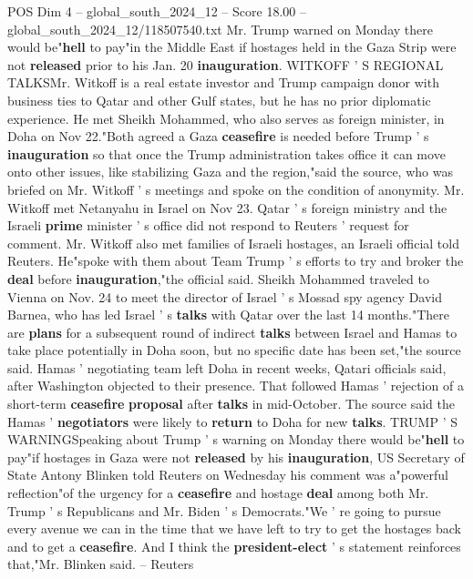 \begin{textsample}{POS Dim 4 – global\_south\_2024\_12 – Score 18.00 – global\_south\_2024\_12/118507540.txt}
Mr.
Trump warned on Monday there would be"\textbf{hell} to pay"in the Middle East if hostages held in the Gaza Strip were not \textbf{released} prior to his Jan. 20 \textbf{inauguration}.
WITKOFF ' S REGIONAL TALKSMr.
Witkoff is a real estate investor and Trump campaign donor with business ties to Qatar and other Gulf states, but he has no prior diplomatic experience.
He met Sheikh Mohammed, who also serves as foreign minister, in Doha on Nov 22."Both agreed a Gaza \textbf{ceasefire} is needed before Trump ' s \textbf{inauguration} so that once the Trump administration takes office it can move onto other issues, like stabilizing Gaza and the region,"said the source, who was briefed on Mr.
Witkoff ' s meetings and spoke on the condition of anonymity.
Mr.
Witkoff met Netanyahu in Israel on Nov 23.
Qatar ' s foreign ministry and the Israeli \textbf{prime} minister ' s office did not respond to Reuters ' request for comment.
Mr.
Witkoff also met families of Israeli hostages, an Israeli official told Reuters.
He"spoke with them about Team Trump ' s efforts to try and broker the \textbf{deal} before \textbf{inauguration},"the official said.
Sheikh Mohammed traveled to Vienna on Nov. 24 to meet the director of Israel ' s Mossad spy agency David Barnea, who has led Israel ' s \textbf{talks} with Qatar over the last 14 months."There are \textbf{plans} for a subsequent round of indirect \textbf{talks} between Israel and Hamas to take place potentially in Doha soon, but no specific date has been set,"the source said.
Hamas ' negotiating team left Doha in recent weeks, Qatari officials said, after Washington objected to their presence.
That followed Hamas ' rejection of a short-term \textbf{ceasefire} \textbf{proposal} after \textbf{talks} in mid-October.
The source said the Hamas ' \textbf{negotiators} were likely to \textbf{return} to Doha for new \textbf{talks}.
TRUMP ' S WARNINGSpeaking about Trump ' s warning on Monday there would be"\textbf{hell} to pay"if hostages in Gaza were not \textbf{released} by his \textbf{inauguration}, US Secretary of State Antony Blinken told Reuters on Wednesday his comment was a"powerful reflection"of the urgency for a \textbf{ceasefire} and hostage \textbf{deal} among both Mr.
Trump ' s Republicans and Mr.
Biden ' s Democrats."We ' re going to pursue every avenue we can in the time that we have left to try to get the hostages back and to get a \textbf{ceasefire}.
And I think the \textbf{president-elect} ' s statement reinforces that,"Mr.
Blinken said. -- Reuters

\end{textsample}
